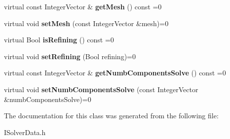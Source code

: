 \begin{DoxyCompactItemize}
\item 
\hypertarget{classISolverData_ad70dc78009a260f66ec6f1f70595b6e2}{
virtual const IntegerVector \& {\bfseries getMesh} () const =0}
\label{classISolverData_ad70dc78009a260f66ec6f1f70595b6e2}

\item 
\hypertarget{classISolverData_a92ab1d515b4821bef0baa4c9aa1329b2}{
virtual void {\bfseries setMesh} (const IntegerVector \&mesh)=0}
\label{classISolverData_a92ab1d515b4821bef0baa4c9aa1329b2}

\item 
\hypertarget{classISolverData_a13a702e8d1bbabe4fcdd1fefceac540b}{
virtual Bool {\bfseries isRefining} () const =0}
\label{classISolverData_a13a702e8d1bbabe4fcdd1fefceac540b}

\item 
\hypertarget{classISolverData_a00920a57269b67f4b381e98fe98bd77b}{
virtual void {\bfseries setRefining} (Bool refining)=0}
\label{classISolverData_a00920a57269b67f4b381e98fe98bd77b}

\item 
\hypertarget{classISolverData_a9b5aafd177911c1b61d5ae880c4cef3b}{
virtual const IntegerVector \& {\bfseries getNumbComponentsSolve} () const =0}
\label{classISolverData_a9b5aafd177911c1b61d5ae880c4cef3b}

\item 
\hypertarget{classISolverData_a1bc63351b238535b4e73649ef237a53c}{
virtual void {\bfseries setNumbComponentsSolve} (const IntegerVector \&numbComponentsSolve)=0}
\label{classISolverData_a1bc63351b238535b4e73649ef237a53c}

\end{DoxyCompactItemize}


The documentation for this class was generated from the following file:\begin{DoxyCompactItemize}
\item 
ISolverData.h\end{DoxyCompactItemize}
